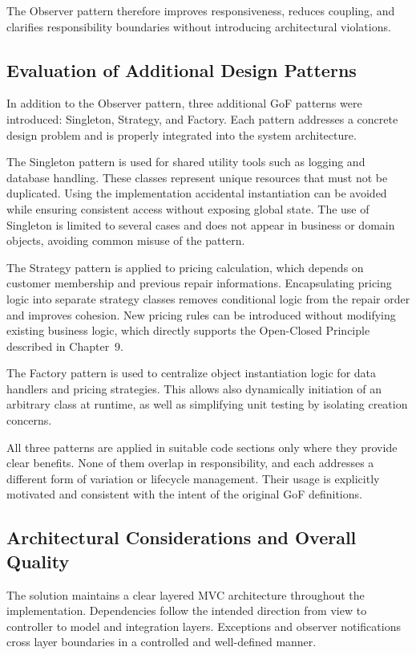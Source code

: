 \documentclass[a4paper]{scrartcl}
\begin{document}
The Observer pattern therefore improves responsiveness, reduces coupling, and clarifies responsibility boundaries without introducing architectural violations.

\subsection{Evaluation of Additional Design Patterns}

In addition to the Observer pattern, three additional GoF patterns were introduced: Singleton, Strategy, and Factory. Each pattern addresses a concrete design problem and is properly integrated into the system architecture.

The Singleton pattern is used for shared utility tools such as logging and database handling. These classes represent unique resources that must not be duplicated. Using the implementation accidental instantiation can be avoided while ensuring consistent access without exposing global state. The use of Singleton is limited to several cases and does not appear in business or domain objects, avoiding common misuse of the pattern.

The Strategy pattern is applied to pricing calculation, which depends on customer membership and previous repair informations. Encapsulating pricing logic into separate strategy classes removes conditional logic from the repair order and improves cohesion. New pricing rules can be introduced without modifying existing business logic, which directly supports the Open-Closed Principle described in Chapter~9.

The Factory pattern is used to centralize object instantiation logic for data handlers and pricing strategies. This allows also dynamically initiation of an arbitrary class at runtime, as well as simplifying unit testing by isolating creation concerns.

All three patterns are applied in suitable code sections only where they provide clear benefits. None of them overlap in responsibility, and each addresses a different form of variation or lifecycle management. Their usage is explicitly motivated and consistent with the intent of the original GoF definitions.

\subsection{Architectural Considerations and Overall Quality}

The solution maintains a clear layered MVC architecture throughout the implementation. Dependencies follow the intended direction from view to controller to model and integration layers. Exceptions and observer notifications cross layer boundaries in a controlled and well-defined manner.
\end{document}
